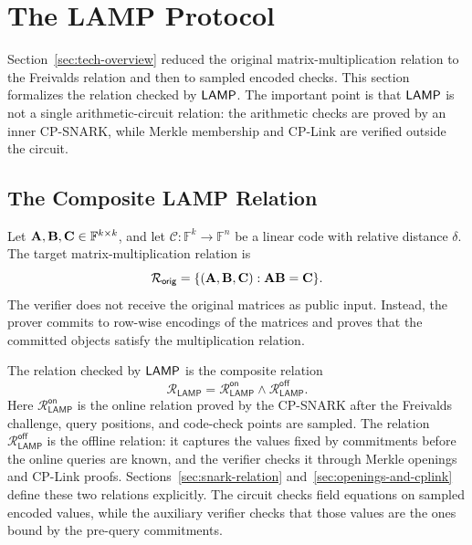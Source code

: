 \section{The LAMP Protocol}
\label{sec:construction}

Section~\ref{sec:tech-overview} reduced the original matrix-multiplication
relation to the Freivalds relation and then to sampled encoded checks.  This
section formalizes the relation checked by \(\textsf{LAMP}\).  The important point is
that \(\textsf{LAMP}\) is not a single arithmetic-circuit relation: the arithmetic
checks are proved by an inner CP-SNARK, while Merkle membership and CP-Link are
verified outside the circuit.

\subsection{The Composite LAMP Relation}
\label{sec:relation-chain}

Let \(\mathbf{A},\mathbf{B},\mathbf{C}\in\mathbb{F}^{k\times k}\), and let
\(\mathcal{C}:\mathbb{F}^k\to\mathbb{F}^n\) be a linear code with
relative distance \(\delta\).  The target matrix-multiplication relation is
\[
  \mathcal{R}_{\mathsf{orig}}
  =
  \{(\mathbf{A},\mathbf{B},\mathbf{C}) :
    \mathbf{A}\mathbf{B}=\mathbf{C}\}.
\]
The verifier does not receive the original matrices as public input.  Instead, the
prover commits to row-wise encodings of the matrices and proves that the
committed objects satisfy the multiplication relation.

The relation checked by \(\textsf{LAMP}\) is the composite relation
\[
  \mathcal{R}_{\mathsf{LAMP}}
  =
  \mathcal{R}_{\mathsf{LAMP}}^{\mathsf{on}}
  \land
  \mathcal{R}_{\mathsf{LAMP}}^{\mathsf{off}} .
\]
Here \(\mathcal{R}_{\mathsf{LAMP}}^{\mathsf{on}}\) is the online relation proved by the CP-SNARK after the Freivalds challenge, query positions, and code-check points are sampled.  The relation \(\mathcal{R}_{\mathsf{LAMP}}^{\mathsf{off}}\) is the offline relation: it captures the values fixed by commitments before the online queries are known, and the verifier checks it through Merkle openings and CP-Link proofs.
Sections~\ref{sec:snark-relation} and~\ref{sec:openings-and-cplink} define
these two relations explicitly.
The circuit checks field equations on sampled encoded values, while the auxiliary verifier checks that those values are the ones bound by the pre-query commitments.

